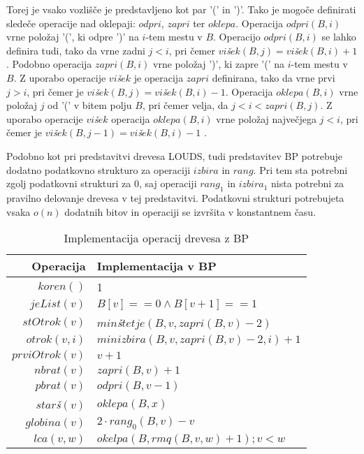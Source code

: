 Torej je vsako vozlišče je predstavljeno kot par '(' in ')'. Tako je mogoče definirati sledeče operacije nad oklepaji: $odpri$, $zapri$ ter $oklepa$. Operacija $odpri(B,i)$ vrne položaj '(', ki odpre ')' na $i$-tem mestu v $B$. Operacijo $odpri(B,i)$ se lahko definira tudi, tako da vrne zadni $j<i$, pri čemer $vi$\textit{š}$ek(B,j)=vi$\textit{š}$ek(B,i)+1$. Podobno operacija $zapri(B,i)$ vrne položaj ')', ki zapre '(' na $i$-tem mestu v $B$. Z uporabo operacije $vi$\textit{š}$ek$ je operacija $zapri$ definirana, tako da vrne prvi $j>i$, pri čemer je $vi$\textit{š}$ek(B,j)=vi$\textit{š}$ek(B,i)-1$. Operacija $oklepa(B,i)$ vrne položaj $j$ od '(' v bitem polju $B$, pri čemer velja, da $j<i<zapri(B,j)$. Z uporabo operacije $vi$\textit{š}$ek$ operacija $oklepa(B,i)$ vrne položaj največjega $j<i$, pri čemer je $vi$\textit{š}$ek(B,j-1)=vi$\textit{š}$ek(B,i)-1$ \cite{Navarro2016}.

Podobno kot pri predstavitvi drevesa LOUDS, tudi predstavitev BP potrebuje dodatno podatkovno strukturo za operaciji $izbira$ in $rang$. Pri tem sta potrebni zgolj podatkovni strukturi za $0$, saj  operaciji $rang_1$ in $izbira_1$ nista potrebni za pravilno delovanje drevesa v tej predstavitvi. Podatkovni strukturi potrebujeta vsaka $o(n)$ dodatnih bitov in operaciji se izvršita v konstantnem času.

\begin{table}[htb]
    \centering
      \caption{Implementacija operacij drevesa z BP}
    \begin{tabular}{r|l}
\textbf{Operacija}& \textbf{Implementacija v BP} \\\hline
         $koren()$& 1\\
         $jeList(v)$& $B[v]==0 \wedge B[v+1]==1$\\
         $stOtrok(v)$& $min$\textit{š}$tetje(B,v,zapri(B,v)-2)$\\
         $otrok(v,i)$&  $minizbira(B,v,zapri(B,v)-2,i)+1$\\
         $prviOtrok(v)$& $v+1$\\
         $nbrat(v)$& $zapri(B,v)+1$ \\
         $pbrat(v)$& $odpri(B,v-1)$ \\
         $star$\textit{š}$(v)$& $oklepa(B,x)$ \\
         $globina(v)$& $2\cdot rang_0(B,v)-v$ \\
         $lca(v,w)$&  $okelpa(B,rmq(B,v,w)+1);v<w$\\
    \end{tabular}  
    \label{tab:BPop}
\end{table}

